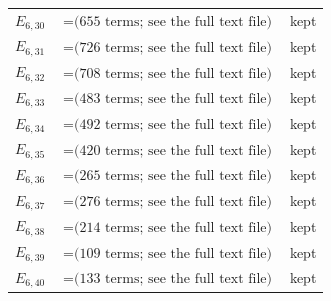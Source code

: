 \documentclass[10pt]{article}
\begin{document}
\begin{longtable}{r>{\raggedright\arraybackslash}p{}>{\raggedright\arraybackslash}p{}}
$E_{6,30}$ & $= \text{(655 terms; see the full text file)}$ & kept \\
$E_{6,31}$ & $= \text{(726 terms; see the full text file)}$ & kept \\
$E_{6,32}$ & $= \text{(708 terms; see the full text file)}$ & kept \\
$E_{6,33}$ & $= \text{(483 terms; see the full text file)}$ & kept \\
$E_{6,34}$ & $= \text{(492 terms; see the full text file)}$ & kept \\
$E_{6,35}$ & $= \text{(420 terms; see the full text file)}$ & kept \\
$E_{6,36}$ & $= \text{(265 terms; see the full text file)}$ & kept \\
$E_{6,37}$ & $= \text{(276 terms; see the full text file)}$ & kept \\
$E_{6,38}$ & $= \text{(214 terms; see the full text file)}$ & kept \\
$E_{6,39}$ & $= \text{(109 terms; see the full text file)}$ & kept \\
$E_{6,40}$ & $= \text{(133 terms; see the full text file)}$ & kept \\

\end{longtable}
\end{document}
